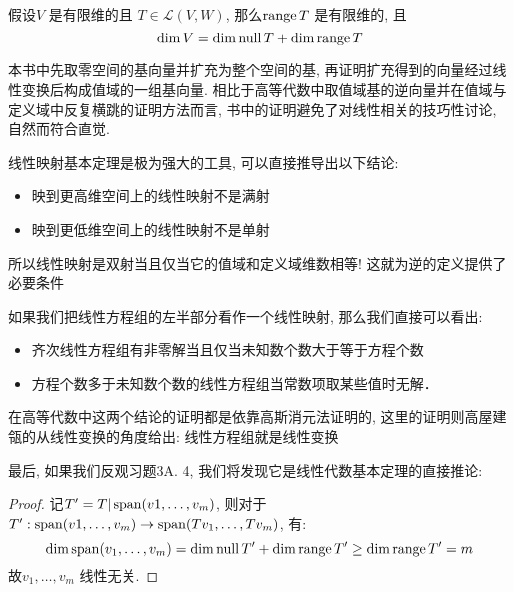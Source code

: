 \begin{theorem}
    假设\(V\) 是有限维的且 \(T \in \mathscr{L}(V,W)\), 那么\(\operatorname{range}
    T\) 是有限维的, 且\[
        \dim V = \dim \operatorname{null} T + \dim \operatorname{range} T
    \]
\end{theorem}

本书中先取零空间的基向量并扩充为整个空间的基, 再证明扩充得到的向量经过线性变换后构成值域的一组基向量.
相比于高等代数中取值域基的逆向量并在值域与定义域中反复横跳的证明方法而言, 书中的证明避免了对线性相关的技巧性讨论, 自然而符合直觉.

线性映射基本定理是极为强大的工具, 可以直接推导出以下结论:

\begin{itemize}
    \item 映到更高维空间上的线性映射不是满射
    \item 映到更低维空间上的线性映射不是单射
\end{itemize}
所以线性映射是双射当且仅当它的值域和定义域维数相等! 这就为逆的定义提供了必要条件

如果我们把线性方程组的左半部分看作一个线性映射, 那么我们直接可以看出:
\begin{itemize}
    \item 齐次线性方程组有非零解当且仅当未知数个数大于等于方程个数
    \item 方程个数多于未知数个数的线性方程组当常数项取某些值时无解．
\end{itemize}

在高等代数中这两个结论的证明都是依靠高斯消元法证明的, 这里的证明则高屋建瓴的从线性变换的角度给出: 线性方程组就是线性变换

最后, 如果我们反观习题3A. 4, 我们将发现它是线性代数基本定理的直接推论:
\begin{proof}
    记\(T^{\prime}= T|\operatorname{span}(v1, \dots, v_{m})\),
    则对于\(T^{\prime}: \operatorname{span}(v1, \dots, v_{m}) \to
    \operatorname{span}(Tv_{1}, \dots, Tv_{m})\), 有:
    \[
        \dim \operatorname{span}(v_{1}, \dots, v_{m}) = \dim \operatorname{null} T^{\prime} +
        \dim \operatorname{range} T^{\prime} \geq \dim \operatorname{range} T^{\prime} = m
    \]
    故\(v_{1}, \dots, v_{m}\) 线性无关.
\end{proof}